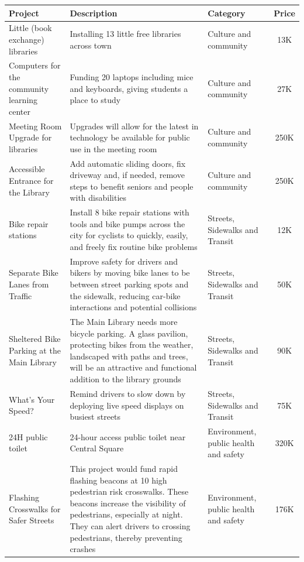 \documentclass[10pt]{article}
\begin{document}
\begin{appendices}
\begin{longtable}[ht!]{|p{4cm}|p{8cm}|p{3cm}|c|}
    \hline
    \textbf{Project} & \textbf{Description} & \textbf{Category} & \textbf{Price}\\
    \hline
    Little (book exchange) libraries &  Installing 13 little free libraries across town & Culture and community & 13K\\
    \hline
    Computers for the community learning center & Funding 20 laptops including mice and keyboards, giving students a place to study & Culture and community &  27K\\
    \hline
    Meeting Room Upgrade for libraries & Upgrades will allow for the latest in technology be available for public use in the meeting room & Culture and community &  250K\\
    \hline
    Accessible Entrance for the Library & Add automatic sliding doors, fix driveway and, if needed, remove steps to benefit seniors and people with disabilities & Culture and community & 250K\\
    \hline
    Bike repair stations & Install 8 bike repair stations with tools and bike pumps across the city for cyclists to quickly, easily, and freely fix routine bike problems & Streets, Sidewalks and Transit & 12K\\
    \hline
    Separate Bike Lanes from Traffic & Improve safety for drivers and bikers by moving bike lanes to be between street parking spots and the sidewalk, reducing car-bike interactions and potential collisions & Streets, Sidewalks and Transit & 50K\\
    \hline
    Sheltered Bike Parking at the Main Library & The Main Library needs more bicycle parking. A glass pavilion, protecting bikes from the weather, landscaped with paths and trees, will be an attractive and functional addition to the library grounds & Streets, Sidewalks and Transit & 90K\\
    \hline
    What’s Your Speed? & Remind drivers to slow down by deploying live speed displays on busiest streets &  Streets, Sidewalks and Transit & 75K\\
    \hline
    24H public toilet & 24-hour access public toilet near Central Square & Environment, public health and safety & 320K\\
    \hline
    Flashing Crosswalks for Safer Streets & This project would fund rapid flashing beacons at 10 high pedestrian risk crosswalks. These beacons increase the visibility of pedestrians, especially at night. They can alert drivers to crossing pedestrians, thereby preventing crashes & Environment, public health and safety & 176K\\

\end{longtable}
\end{appendices}
\end{document}
